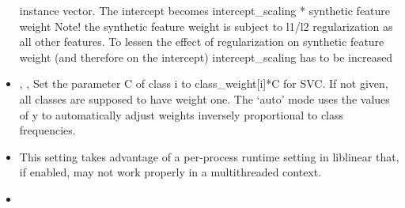 \begin{itemize}
  instance vector.
  The intercept becomes intercept\_scaling * synthetic feature
  weight Note! the synthetic feature weight is subject to l1/l2 regularization
  as all other features.
  To lessen the effect of regularization on synthetic feature weight (and
  therefore on the intercept) intercept\_scaling has to be
  increased
  \item {} , ,
  Set the parameter C of class i to class\_weight[i]*C for SVC.
  If not given, all classes are supposed to have weight one.
  The ‘auto’ mode uses the values of y to automatically adjust weights
  inversely proportional to class frequencies.
  \item \verDescriptionB
  \nb This setting takes advantage of a per-process runtime setting in
  liblinear that, if enabled, may not work properly in a multithreaded context.
  \item {}
\end{itemize}

